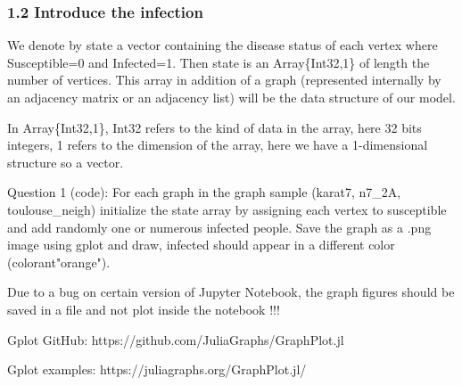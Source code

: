 \documentclass[11pt]{article}
\begin{document}
    \subsubsection{1.2 Introduce the
infection}\label{introduce-the-infection}

We denote by state a vector containing the disease status of each vertex
where Susceptible=0 and Infected=1. Then state is an Array\{Int32,1\} of
length the number of vertices. This array in addition of a graph
(represented internally by an adjacency matrix or an adjacency list)
will be the data structure of our model.

{In Array\{Int32,1\}, Int32 refers to the kind of data in the array,
here 32 bits integers, 1 refers to the dimension of the array, here we
have a 1-dimensional structure so a vector.}

    Question 1 (code): For each graph in the graph sample (karat7, n7\_2A,
toulouse\_neigh) initialize the state array by assigning each vertex to
susceptible and add randomly one or numerous infected people. Save the
graph as a .png image using gplot and draw, infected should appear in a
different color (colorant"orange").

Due to a bug on certain version of Jupyter Notebook, the graph {figures
should be saved in a file and not plot inside the notebook } !!!

Gplot GitHub: https://github.com/JuliaGraphs/GraphPlot.jl

Gplot examples: https://juliagraphs.org/GraphPlot.jl/
\end{document}
